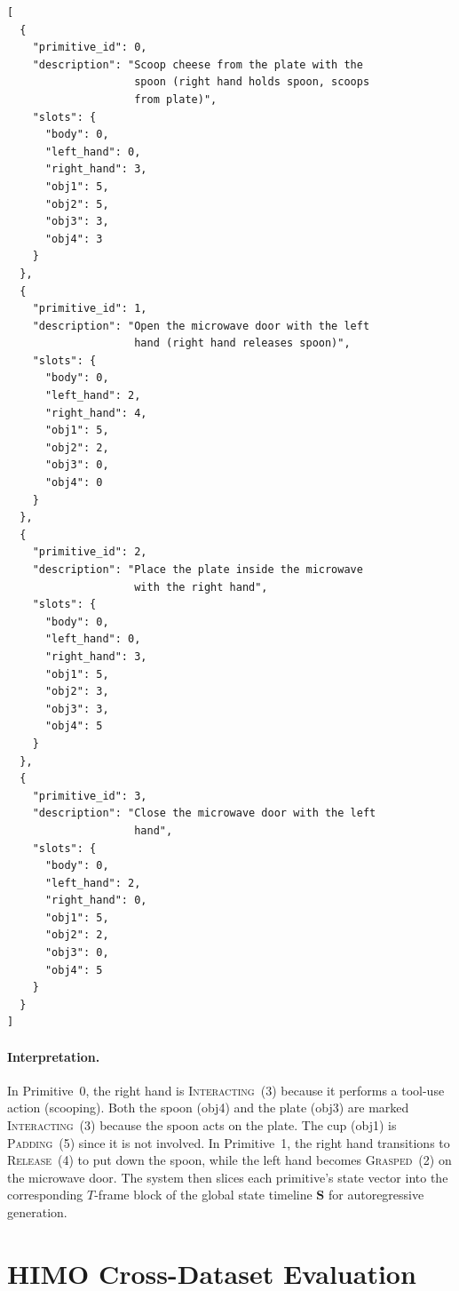 \documentclass[sigconf, screen, review, anonymous]{acmart}
\begin{document}
\begin{lstlisting}[style=prompt]
[
  {
    "primitive_id": 0,
    "description": "Scoop cheese from the plate with the
                    spoon (right hand holds spoon, scoops
                    from plate)",
    "slots": {
      "body": 0,
      "left_hand": 0,
      "right_hand": 3,
      "obj1": 5,
      "obj2": 5,
      "obj3": 3,
      "obj4": 3
    }
  },
  {
    "primitive_id": 1,
    "description": "Open the microwave door with the left
                    hand (right hand releases spoon)",
    "slots": {
      "body": 0,
      "left_hand": 2,
      "right_hand": 4,
      "obj1": 5,
      "obj2": 2,
      "obj3": 0,
      "obj4": 0
    }
  },
  {
    "primitive_id": 2,
    "description": "Place the plate inside the microwave
                    with the right hand",
    "slots": {
      "body": 0,
      "left_hand": 0,
      "right_hand": 3,
      "obj1": 5,
      "obj2": 3,
      "obj3": 3,
      "obj4": 5
    }
  },
  {
    "primitive_id": 3,
    "description": "Close the microwave door with the left
                    hand",
    "slots": {
      "body": 0,
      "left_hand": 2,
      "right_hand": 0,
      "obj1": 5,
      "obj2": 2,
      "obj3": 0,
      "obj4": 5
    }
  }
]
\end{lstlisting}

\paragraph{Interpretation.}
In Primitive~0, the right hand is \textsc{Interacting}~(3) because it performs a tool-use action (scooping). Both the spoon (obj4) and the plate (obj3) are marked \textsc{Interacting}~(3) because the spoon acts on the plate. The cup (obj1) is \textsc{Padding}~(5) since it is not involved. In Primitive~1, the right hand transitions to \textsc{Release}~(4) to put down the spoon, while the left hand becomes \textsc{Grasped}~(2) on the microwave door. The system then slices each primitive's state vector into the corresponding $T$-frame block of the global state timeline $\mathbf{S}$ for autoregressive generation.


\section{HIMO Cross-Dataset Evaluation}
\label{sec:himo_eval}
\end{document}
